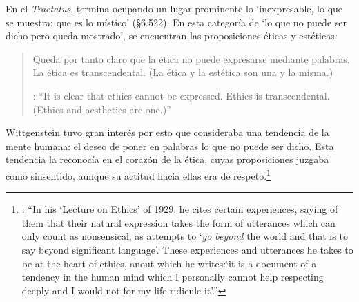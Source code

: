 En el \emph{Tractatus}, termina ocupando un lugar prominente lo \enquote*{inexpresable, lo que se muestra; que es lo místico} (\S6.522). En esta categoría de `lo que no puede ser dicho pero queda mostrado', se encuentran las proposiciones éticas y estéticas: \blockquote[{\cite[\S6.421]{wittgenstein1922tractatus}}: \enquote{It is clear that ethics cannot be expressed. Ethics is transcendental. (Ethics and aesthetics are one.)}]{Queda por tanto claro que la ética no puede expresarse mediante palabras. La ética es transcendental. (La ética y la estética son una y la misma.)}. Wittgenstein tuvo gran interés por esto que consideraba una tendencia de la mente humana: el deseo de poner en palabras lo que no puede ser dicho. Esta tendencia la reconocía en el corazón de la ética, cuyas proposiciones juzgaba como sinsentido, aunque su actitud hacia ellas era de respeto.\footnote{\cite[Cf.~][211]{teichmann2008ans}: \enquote{In his `Lecture on Ethics' of 1929, he cites certain experiences, saying of them that their natural expression takes the form of utterances which can only count as nonsensical, as attempts to `\emph{go beyond} the world and that is to say beyond significant language'. These experiences and utterances he takes to be at the heart of ethics, anout which he writes:`it is a document of a tendency in the human mind which I personally cannot help respecting deeply and I would not for my life ridicule it'.}}

